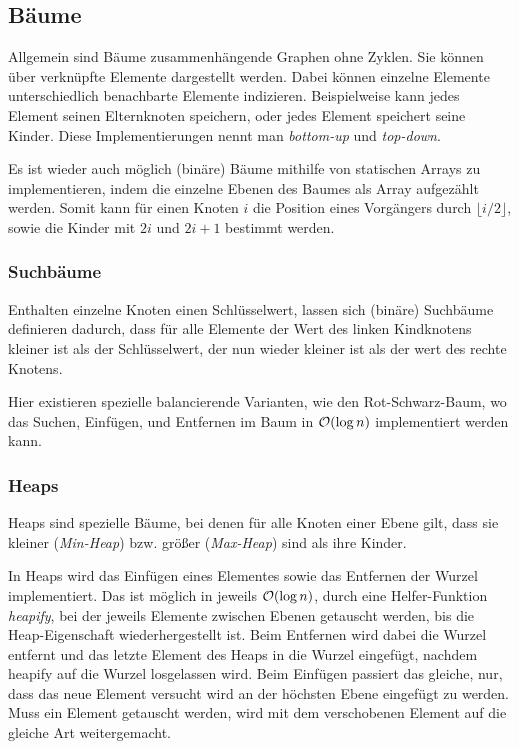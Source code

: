 \subsection{Bäume}
Allgemein sind Bäume zusammenhängende Graphen ohne Zyklen.
Sie können über verknüpfte Elemente dargestellt werden.
Dabei können einzelne Elemente unterschiedlich benachbarte Elemente indizieren.
Beispielweise kann jedes Element seinen Elternknoten speichern, oder jedes Element speichert seine Kinder.
Diese Implementierungen nennt man \emph{bottom-up} und \emph{top-down}.

Es ist wieder auch möglich (binäre) Bäume mithilfe von statischen Arrays zu implementieren, indem die einzelne Ebenen des Baumes als Array aufgezählt werden.
Somit kann für einen Knoten \(i\) die Position eines Vorgängers durch \(\lfloor i / 2 \rfloor\), sowie die Kinder mit \(2i\) und \(2i+1\) bestimmt werden.

\subsubsection{Suchbäume}
Enthalten einzelne Knoten einen Schlüsselwert, lassen sich (binäre) Suchbäume definieren dadurch, dass für alle Elemente der Wert des linken Kindknotens kleiner ist als der Schlüsselwert, der nun wieder kleiner ist als der wert des rechte Knotens.

Hier existieren spezielle balancierende Varianten, wie den Rot-Schwarz-Baum, wo das Suchen, Einfügen, und Entfernen im Baum in \(\mathcal O(\log n)\) implementiert werden kann.

\subsubsection{Heaps}
Heaps sind spezielle Bäume, bei denen für alle Knoten einer Ebene gilt, dass sie kleiner (\emph{Min-Heap}) bzw. größer (\emph{Max-Heap}) sind als ihre Kinder.

In Heaps wird das Einfügen eines Elementes sowie das Entfernen der Wurzel implementiert.
Das ist möglich in jeweils \(\mathcal O(\log n)\), durch eine Helfer-Funktion \emph{heapify}, bei der jeweils Elemente zwischen Ebenen getauscht werden, bis die Heap-Eigenschaft wiederhergestellt ist.
Beim Entfernen wird dabei die Wurzel entfernt und das letzte Element des Heaps in die Wurzel eingefügt, nachdem heapify auf die Wurzel losgelassen wird.
Beim Einfügen passiert das gleiche, nur, dass das neue Element versucht wird an der höchsten Ebene eingefügt zu werden.
Muss ein Element getauscht werden, wird mit dem verschobenen Element auf die gleiche Art weitergemacht.

